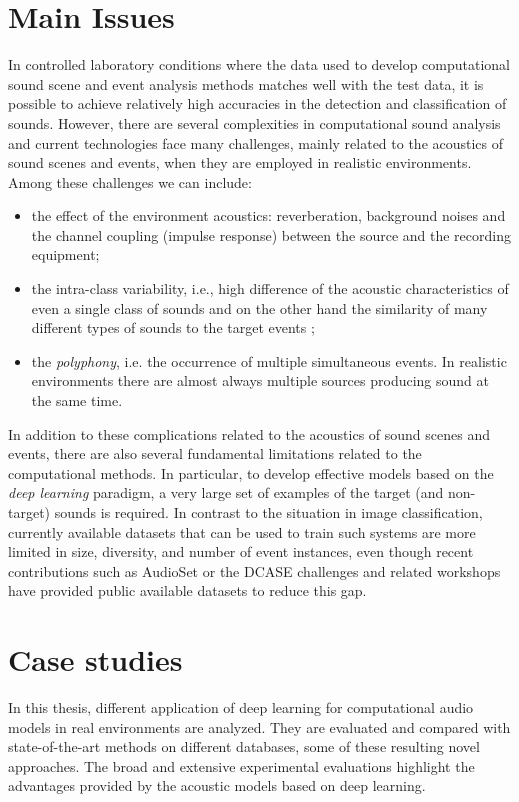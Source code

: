 \section{Main Issues}
In controlled laboratory conditions where the data used to develop computational sound scene and event analysis methods matches well with the test data, it is possible to achieve relatively high accuracies in the detection and classification of sounds.  However, there are several complexities in computational sound analysis and current technologies face many challenges, mainly related to the acoustics of sound scenes and events, when they are employed in realistic environments.
Among these challenges we can include:
\begin{itemize}
	\item the effect of the environment acoustics: reverberation, background noises and the channel coupling (impulse response) between the source and the recording equipment;
	\item the intra-class variability, i.e., high difference of the acoustic characteristics of even a single class of sounds and on the other hand the similarity of many different types of sounds to the target events  \cite{stowell2015acoustic};
	\item the \textit{polyphony}, i.e. the occurrence of multiple simultaneous events. In realistic environments there
	are almost always multiple sources producing sound at the same time. 
\end{itemize}

In addition to these complications related to the acoustics of sound scenes and
events, there are also several fundamental limitations related to the computational methods. In particular, to develop effective models based on the \textit{deep learning} paradigm, a very large set of examples of the
target (and non-target) sounds is required. In contrast to the situation in image classification, currently available datasets that can be used to train such systems are more limited in size, diversity, and number of event instances, even though recent contributions such as AudioSet \cite{gemmeke2017audio} or the DCASE challenges
and related workshops \cite{mesaros2016tut, DCASE2017Workshop,  stowell2018automatic} have provided public available datasets to reduce this gap.




\section{Case studies}
In this thesis, different application of deep learning for computational audio models in real environments are analyzed. They are evaluated and compared with state-of-the-art methods on different databases, some of these resulting novel approaches. The broad and extensive experimental evaluations highlight the advantages provided by the acoustic models based on deep learning.

